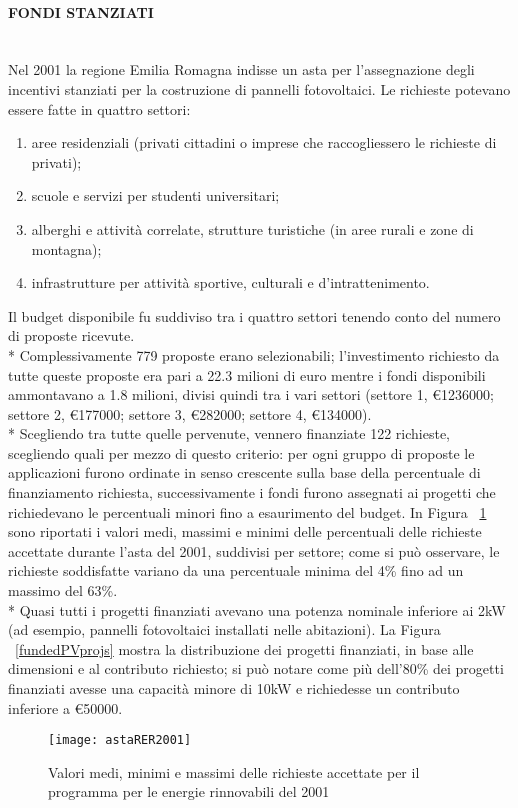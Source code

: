 \documentclass[12pt,a4paper,openright,twoside]{report}
\newcommand{\myparagraph}[1]{\paragraph{#1}\mbox{}\\}
\begin{document}
\myparagraph{FONDI STANZIATI}
Nel 2001 la regione Emilia Romagna indisse un asta per l'assegnazione degli incentivi stanziati per la costruzione di pannelli fotovoltaici. Le richieste potevano essere fatte in quattro settori:
\begin{enumerate}
\item aree residenziali (privati cittadini o imprese che raccogliessero le richieste di privati);
\item scuole e servizi per studenti universitari;
\item alberghi e attività correlate, strutture turistiche (in aree rurali e zone di montagna);
\item infrastrutture per attività sportive, culturali e d'intrattenimento. 
\end{enumerate}
Il budget disponibile fu suddiviso tra i quattro settori tenendo conto del numero di proposte ricevute.\\*
Complessivamente 779 proposte erano selezionabili; l'investimento richiesto da tutte queste proposte era pari a 22.3 milioni di euro mentre i fondi disponibili ammontavano a 1.8 milioni, divisi quindi tra i vari settori (settore 1, \euro1236000; settore 2, \euro177000; settore 3, \euro282000; settore 4, \euro134000).\\*
Scegliendo tra tutte quelle pervenute, vennero finanziate 122 richieste, scegliendo quali per mezzo di questo criterio: per ogni gruppo di proposte le applicazioni furono ordinate in senso crescente sulla base della percentuale di finanziamento richiesta, successivamente i fondi furono assegnati ai progetti che richiedevano le percentuali minori fino a esaurimento del budget. In Figura ~\ref{astaRER2001} sono riportati i valori medi, massimi e minimi delle percentuali delle richieste accettate durante l'asta del 2001, suddivisi per settore; come si può osservare, le richieste soddisfatte variano da una percentuale minima del 4\% fino ad un massimo del 63\%. \\*
Quasi tutti i progetti finanziati avevano una potenza nominale inferiore ai 2kW (ad esempio, pannelli fotovoltaici installati nelle abitazioni). La Figura ~\ref{fundedPVprojs} mostra la distribuzione dei progetti finanziati, in base alle dimensioni e al contributo richiesto; si può notare come più dell'80\% dei progetti finanziati avesse una capacità minore di 10kW e richiedesse un contributo inferiore a \euro50000.

\begin{figure}[hbt]
	\centering
	\texttt{[image: astaRER2001]}
	\caption{Valori medi, minimi e massimi delle richieste accettate per il programma per le energie rinnovabili del 2001}
	\label{astaRER2001}
\end{figure}
\end{document}
